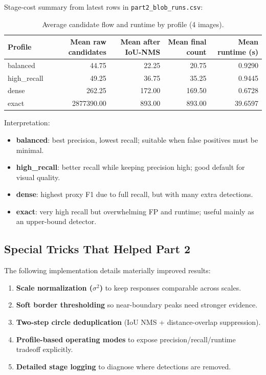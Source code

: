 {Stage-cost summary from latest rows in \texttt{part2\_blob\_runs.csv}:
\begin{table}[htbp]
\centering
\small
\begin{tabular}{l|r|r|r|r}
\hline
Profile & Mean raw candidates & Mean after IoU-NMS & Mean final count & Mean runtime (s)\\
\hline
balanced & 44.75 & 22.25 & 20.75 & 0.9290\\
high\_recall & 49.25 & 36.75 & 35.25 & 0.9445\\
dense & 262.25 & 172.00 & 169.50 & 0.6728\\
exact & 2877390.00 & 893.00 & 893.00 & 39.6597\\
\hline
\end{tabular}
\caption{Average candidate flow and runtime by profile (4 images).}
\label{tab:p2-stage-cost}
\end{table}

Interpretation:
\begin{itemize}
\item \textbf{balanced}: best precision, lowest recall; suitable when false positives must be minimal.
\item \textbf{high\_recall}: better recall while keeping precision high; good default for visual quality.
\item \textbf{dense}: highest proxy F1 due to full recall, but with many extra detections.
\item \textbf{exact}: very high recall but overwhelming FP and runtime; useful mainly as an upper-bound detector.
\end{itemize}

\clearpage

\subsection*{Special Tricks That Helped Part 2}
\label{sec:p2-tricks}
The following implementation details materially improved results:
\begin{enumerate}
\item \textbf{Scale normalization ($\sigma^2$)} to keep responses comparable across scales.
\item \textbf{Soft border thresholding} so near-boundary peaks need stronger evidence.
\item \textbf{Two-step circle deduplication} (IoU NMS + distance-overlap suppression).
\item \textbf{Profile-based operating modes} to expose precision/recall/runtime tradeoff explicitly.
\item \textbf{Detailed stage logging} to diagnose where detections are removed.
\end{enumerate}

}
